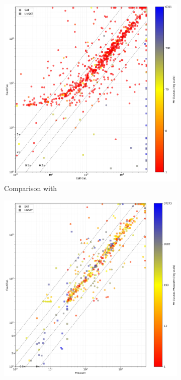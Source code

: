 \begin{figure}[!t]
    \centering
    \begin{subfigure}[t]{0.3\textwidth}
        \centering
        \includegraphics[width=\textwidth]{figs/cadical_vs_cautical.jpg}
        \caption{Comparison with \cadical}
        \label{fig:cautical-vs-cadical}
    \end{subfigure}
    \begin{subfigure}[t]{0.3\textwidth}
        \centering
        \includegraphics[width=\textwidth]{figs/prelearn_vs_cautical.jpg}

\end{subfigure}
\end{figure}
